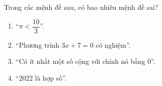 \begin{ex}
Trong các mệnh đề sau, có bao nhiêu mệnh đề sai?
\begin{enumerate}[label=\alph*)]
\item ``$\pi<\dfrac{10}{3}$''.
\item ``Phương trình $3x+7=0$ có nghiệm''.
\item ``Có ít nhất một số cộng với chính nó bằng $0$''.
\item ``$2022$ là hợp số''.
\end{enumerate}
\end{ex}
